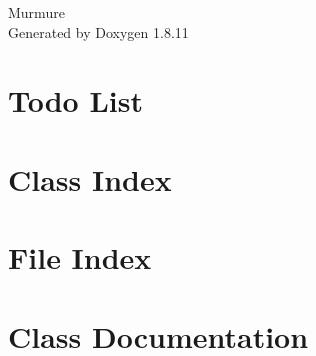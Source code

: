 \documentclass[twoside]{book}
\newcommand{\+}{\discretionary{\mbox{\scriptsize$\hookleftarrow$}}{}{}}
\newcommand{\clearemptydoublepage}{%
  \newpage{\pagestyle{empty}\cleardoublepage}%
}
\begin{document}
\hypersetup{pageanchor=false,
             bookmarksnumbered=true,
             pdfencoding=unicode
            }
\begin{titlepage}
\vspace*{7cm}
\begin{center}%
{\Large Murmure }\\
\vspace*{1cm}
{\large Generated by Doxygen 1.8.11}\\
\end{center}
\end{titlepage}
\clearemptydoublepage
\tableofcontents
\clearemptydoublepage
{}
\hypersetup{pageanchor=true}

\chapter{Todo List}
\label{todo}
\hypertarget{todo}{}

\chapter{Class Index}

\chapter{File Index}

\chapter{Class Documentation}
























\end{document}
